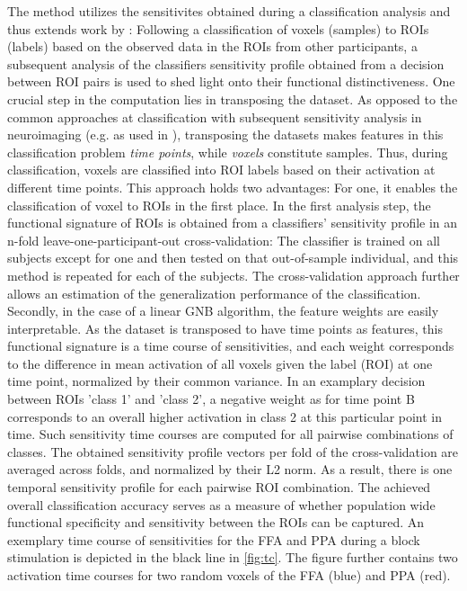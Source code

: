 \documentclass[a4paper, 12pt]{scrreprt}
\begin{document}
The method utilizes the sensitivites obtained during a classification analysis and thus extends work by \textcite{nastase2016}: Following a classification of voxels (samples) to ROIs (labels) based on the observed data in the ROIs from other participants, a subsequent analysis of the classifiers sensitivity profile obtained from a decision between ROI pairs is used to shed light onto their functional distinctiveness. One crucial step in the computation lies in transposing the dataset. As opposed to the common approaches at classification with subsequent sensitivity analysis in neuroimaging (e.g. as used in \textcite{poldrack2009decoding}), transposing the datasets makes features in this classification problem \textit{time points}, while \textit{voxels }constitute samples. Thus, during classification, voxels are classified into ROI labels based on their activation at different time points. \newline
This approach holds two advantages: For one, it enables the classification of voxel to ROIs in the first place. In the first analysis step, the functional signature of ROIs is obtained from a classifiers' sensitivity profile in an n-fold leave-one-participant-out cross-validation: The classifier is trained on all subjects except for one and then tested on that out-of-sample individual, and this method is repeated for each of the subjects. The cross-validation approach further allows an estimation of the generalization performance of the classification. Secondly, in the case of a linear GNB algorithm, the feature weights are easily interpretable. As the dataset is transposed to have time points as features, this functional signature is a time course of sensitivities, and each weight corresponds to the difference in mean activation of all voxels given the label (ROI) at one time point, normalized by their common variance. In an examplary decision between ROIs 'class 1' and 'class 2', a negative weight as for time point B corresponds to an overall higher activation in class 2 at this particular point in time. Such sensitivity time courses are computed for all pairwise combinations of classes. The obtained sensitivity profile vectors per fold of the cross-validation are averaged across folds, and normalized by their L2 norm. As a result, there is one temporal sensitivity profile for each pairwise ROI combination. The achieved overall classification accuracy serves as a measure of whether population wide functional specificity and sensitivity between the ROIs can be captured. An exemplary time course of sensitivities for the FFA and PPA during a block stimulation is depicted in the black line in \ref{fig:tc}. The figure further contains two activation time courses for two random voxels of the FFA (blue) and PPA (red). \newline
\end{document}
